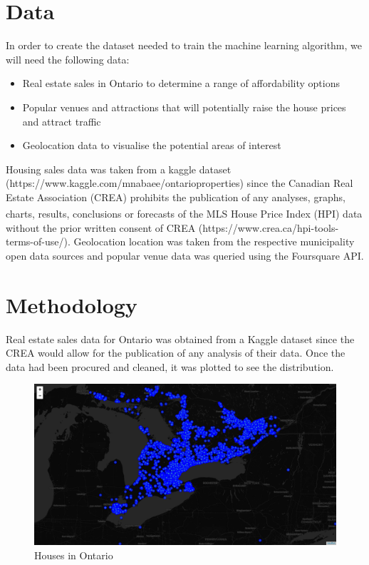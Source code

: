 \documentclass{article}
\begin{document}
\clearpage
\section{Data}

In order to create the dataset needed to train the machine learning algorithm, we will need the following data:

\begin{itemize}
	\item Real estate sales in Ontario to determine a range of affordability options
	\item Popular venues and attractions that will potentially raise the house prices and attract traffic
	\item Geolocation data to visualise the potential areas of interest  
\end{itemize}

Housing sales data was taken from a kaggle dataset (https://www.kaggle.com/mnabaee/ontarioproperties) since the Canadian Real Estate Association (CREA) prohibits the publication of any analyses, graphs, charts, results, conclusions or forecasts of the MLS\textsuperscript{\textregistered} House Price Index (HPI) data without the prior written consent of CREA (https://www.crea.ca/hpi-tools-terms-of-use/). Geolocation location was taken from the respective municipality open data sources and popular venue data was queried using the Foursquare API. 

\section{Methodology}

Real estate sales data for Ontario was obtained from a Kaggle dataset since the CREA would allow for the publication of any analysis of their data. Once the data had been procured and cleaned, it was plotted to see the distribution. 

\begin{figure}[h]
	\centering
	\includegraphics[width=\textwidth]{houses_map.png}
	\caption{Houses in Ontario}
	\label{houses}
\end{figure}
\end{document}
